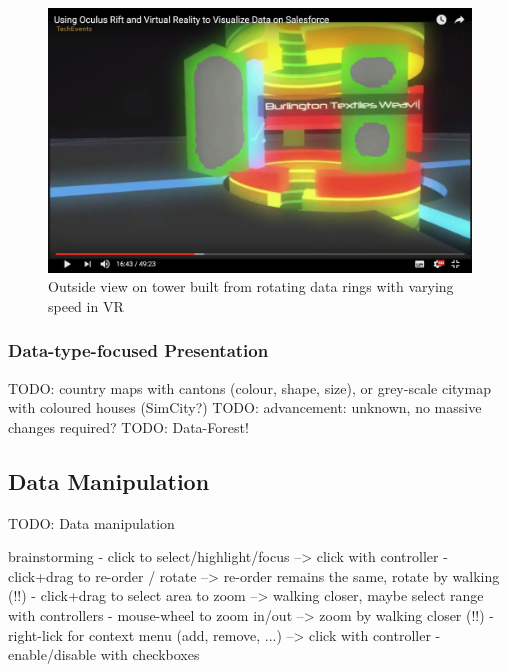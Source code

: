 \begin{figure}[h]
	\begin{center}
		\includegraphics[width=14cm]{03_Figures/05_LitReview/CodeScience2015b.png}
		\caption[Outside view on tower built from rotating data rings with varying speed in VR]{Outside view on tower built from rotating data rings with varying speed in VR \citep{CodeScience2015}}
		\label{fig:rotatingringstower}
	\end{center}
\end{figure}




\subsubsection{Data-type-focused Presentation}

TODO: country maps with cantons (colour, shape, size), or grey-scale citymap with coloured houses (SimCity?)
TODO: advancement: unknown, no massive changes required?
TODO: Data-Forest!



\subsection{Data Manipulation}

TODO: Data manipulation


brainstorming
- click to select/highlight/focus   --> click with controller
- click+drag to re-order / rotate	--> re-order remains the same, rotate by walking (!!)
- click+drag to select area to zoom   --> walking closer, maybe select range with controllers
- mouse-wheel to zoom in/out   --> zoom by walking closer (!!)
- right-lick for context menu (add, remove, ...)   --> click with controller
- enable/disable with checkboxes

